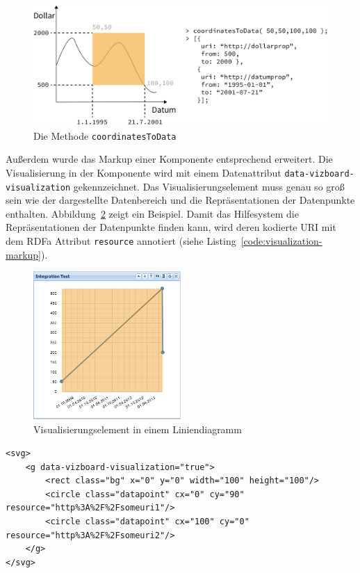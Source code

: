 \documentclass[
	headsepline,
	footsepline,
	fontsize=12pt,
	bibliography=totoc
]{scrbook}
\begin{document}
\begin{figure}[htbp]
   \centering
   \includegraphics[width=\textwidth]{images/implementierung-coordinatesToData.png}
   \caption{Die Methode \texttt{coordinatesToData}}
   \label{figure:coordinatesToData}
\end{figure}

Außerdem wurde das Markup einer Komponente entsprechend erweitert. Die Visualisierung in der Komponente wird mit einem Datenattribut \texttt{data-vizboard-visualization} gekennzeichnet. Das Visualisierungselement muss genau so groß sein wie der dargestellte Datenbereich und die Repräsentationen der Datenpunkte enthalten. Abbildung~\ref{figure:ui-visualization} zeigt ein Beispiel. Damit das Hilfesystem die Repräsentationen der Datenpunkte finden kann, wird deren kodierte URI mit dem RDFa Attribut \texttt{resource} annotiert (siehe Listing~\ref{code:visualization-markup}).

\begin{figure}[htbp]
   \centering
   \includegraphics[width=0.5\textwidth]{images/implementierung-ui-visualization.png}
   \caption{Visualisierungselement in einem Liniendiagramm}
   \label{figure:ui-visualization}
\end{figure}

\lstset{language=HTML}
\begin{lstlisting}[caption={Markup einer Visualisierung}, label=code:visualization-markup]
<svg>
	<g data-vizboard-visualization="true">
		<rect class="bg" x="0" y="0" width="100" height="100"/>
		<circle class="datapoint" cx="0" cy="90" resource="http%3A%2F%2Fsomeuri1"/>
		<circle class="datapoint" cx="100" cy="0" resource="http%3A%2F%2Fsomeuri2"/>
	</g>
</svg>
\end{lstlisting}
\end{document}
